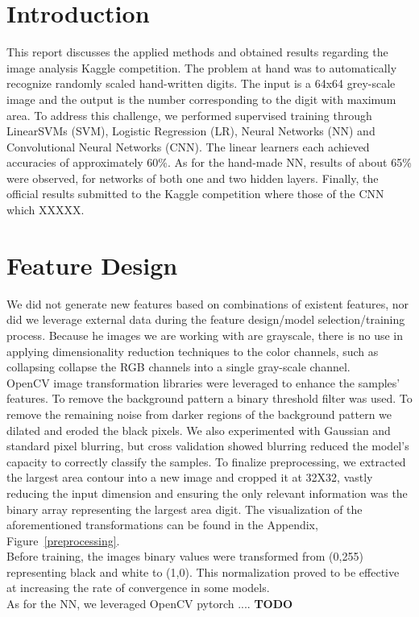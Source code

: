 \documentclass[10pt, hidelinks]{article}
\begin{document}
\section*{Introduction}

This report discusses the applied methods and obtained results regarding the image analysis Kaggle
competition. The problem at hand was to automatically recognize randomly scaled hand-written digits.
The input is a 64x64 grey-scale image and the output is the number corresponding to the digit with
maximum area. To address this challenge, we performed supervised training through LinearSVMs (SVM),
Logistic Regression (LR), Neural Networks (NN) and Convolutional Neural Networks (CNN). The linear
learners each achieved accuracies of approximately 60\%.
As for the hand-made NN, results of about 65\% were observed, for networks of both one and two
hidden layers. Finally, the official results submitted to the Kaggle competition
where those of the CNN which XXXXX.

\section*{Feature Design}

We did not generate new features based on combinations of existent features, nor did we leverage
external data during the feature design/model selection/training process. Because he images we are
working with are grayscale, there is no use in applying dimensionality reduction techniques to the
color channels, such as collapsing collapse the RGB channels into a single gray-scale channel.\\
\noindent OpenCV image transformation libraries were leveraged to enhance the samples' features. To
remove the background pattern a binary threshold filter was used. To remove the remaining noise from
darker regions of the background pattern we dilated and eroded the black pixels. We also
experimented with Gaussian and standard pixel blurring, but cross validation showed blurring reduced
the model's capacity to correctly classify the samples. To finalize preprocessing, we extracted the
largest area contour into a new image and cropped it at 32X32, vastly reducing the input dimension
and ensuring the only relevant information was the binary array representing the largest area digit.
The visualization of the aforementioned transformations can be found in the Appendix,
Figure~\ref{preprocessing}.\\
\noindent Before training, the images binary values were transformed from (0,255) representing black
and white to (1,0). This normalization proved to be effective at increasing the rate of convergence
in some models.\\
\noindent As for the NN, we leveraged OpenCV pytorch  .... \textbf{TODO}
\end{document}
